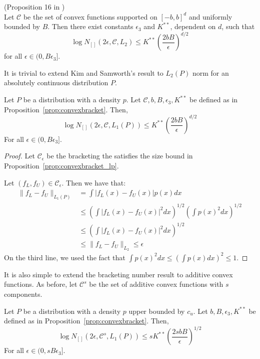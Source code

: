 \begin{proposition} (Proposition 16 in \cite{kim2014global})\\
\label{prop:convexbracket}
Let $\mathcal{C}$ be the set of convex functions supported on $[-b, b]^d$ and uniformly bounded by $B$. Then there exist constants $\epsilon_3$ and $K^{**}$, dependent on $d$, such that
\[
\log N_{[]} (2\epsilon, \mathcal{C}, L_2) \leq K^{**} \left( \frac{2bB}{\epsilon} \right)^{d/2}
\]
for all $\epsilon \in (0, B \epsilon_3]$.
\end{proposition}

It is trivial to extend Kim and Samworth's result to $L_2(P)$ norm for an absolutely continuous distribution $P$.

\begin{proposition}
\label{prop:convexbracket_lp}
Let $P$ be a distribution with a density $p$. Let $\mathcal{C}, b, B, \epsilon_3, K^{**}$ be defined as in Proposition~\ref{prop:convexbracket}. Then,
\[
\log N_{[]} (2\epsilon, \mathcal{C}, L_1(P)) \leq K^{**} \left( \frac{2bB}{\epsilon} \right)^{d/2}
\]
For all $\epsilon \in (0, B\epsilon_3]$.
\end{proposition}

\begin{proof}
Let $\mathcal{C}_\epsilon$ be the bracketing the satisfies the size bound in Proposition~\ref{prop:convexbracket_lp}. 

Let $(f_L, f_U) \in \mathcal{C}_\epsilon$. Then we have that:
\begin{align*}
\| f_L - f_U \|_{L_1(P)} &= \int | f_L(x) - f_U(x)| p(x) dx \\
   &\leq \left( \int | f_L(x) - f_U(x) |^2 dx \right)^{1/2}
      \left( \int p(x)^2 dx \right)^{1/2} \\
  &\leq \left( \int | f_L(x) - f_U(x)|^2 dx \right)^{1/2}\\
 &\leq \| f_L - f_U \|_{L_2} \leq \epsilon
\end{align*}
On the third line, we used the fact that $\int p(x)^2 dx \leq \left( \int p(x) dx \right)^2 \leq 1$.
\end{proof}

It is also simple to extend the bracketing number result to additive convex functions. As before, let $\mathcal{C}^s$ be the set of additive convex functions with $s$ components.

\begin{corollary}
\label{cor:convexadditive_lp}
Let $P$ be a distribution with a density $p$ upper bounded by $c_u$. Let $b, B, \epsilon_3, K^{**}$ be defined as in Proposition~\ref{prop:convexbracket}. Then,
\[
\log N_{[]}(2\epsilon, \mathcal{C}^s, L_1(P)) \leq s K^{**} 
    \left( \frac{2sbB}{\epsilon} \right)^{1/2}
\]
For all $\epsilon \in (0, s B \epsilon_3]$.
\end{corollary}

